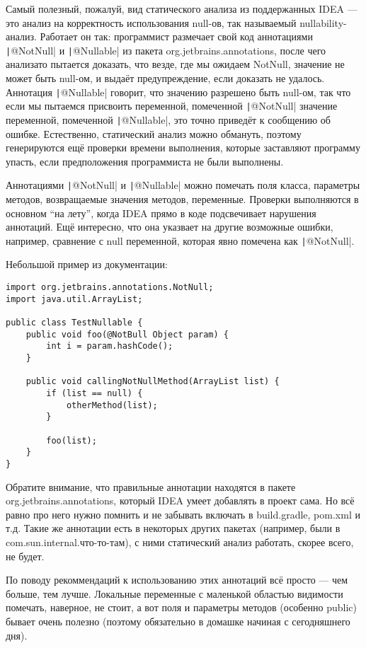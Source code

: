 \documentclass[a5paper]{article}
\begin{document}
Самый полезный, пожалуй, вид статического анализа из поддержанных IDEA --- это анализ на корректность использования null-ов, так называемый nullability-анализ. Работает он так: программист размечает свой код аннотациями \texttt|@NotNull| и \texttt|@Nullable| из пакета org.jetbrains.annotations, после чего анализато пытается доказать, что везде, где мы ожидаем NotNull, значение не может быть null-ом, и выдаёт предупреждение, если доказать не удалось. Аннотация \texttt|@Nullable| говорит, что значению разрешено быть null-ом, так что если мы пытаемся присвоить переменной, помеченной \texttt|@NotNull| значение переменной, помеченной \texttt|@Nullable|, это точно приведёт к сообщению об ошибке. Естественно, статический анализ можно обмануть, поэтому генерируются ещё проверки времени выполнения, которые заставляют программу упасть, если предположения программиста не были выполнены.

Аннотациями \texttt|@NotNull| и \texttt|@Nullable| можно помечать поля класса, параметры методов, возвращаемые значения методов, переменные. Проверки выполняются в основном ``на лету'', когда IDEA прямо в коде подсвечивает нарушения аннотаций. Ещё интересно, что она указвает на другие возможные ошибки, например, сравнение с null переменной, которая явно помечена как \texttt|@NotNull|.

Небольшой пример из документации:

\begin{verbatim}
import org.jetbrains.annotations.NotNull;
import java.util.ArrayList;

public class TestNullable {
    public void foo(@NotBull Object param) {
        int i = param.hashCode();
    }

    public void callingNotNullMethod(ArrayList list) {
        if (list == null) {
            otherMethod(list);
        }

        foo(list);
    }
}
\end{verbatim}

Обратите внимание, что правильные аннотации находятся в пакете org.jetbrains.annotations, который IDEA умеет добавлять в проект сама. Но всё равно про него нужно помнить и не забывать включать в build.gradle, pom.xml и т.д. Такие же аннотации есть в некоторых других пакетах (например, были в com.sun.internal.что-то-там), с ними статический анализ работать, скорее всего, не будет.

По поводу рекоммендаций к использованию этих аннотаций всё просто --- чем больше, тем лучше. Локальные переменные с маленькой областью видимости помечать, наверное, не стоит, а вот поля и параметры методов (особенно public) бывает очень полезно (поэтому обязательно в домашке начиная с сегодняшнего дня). 
\end{document}
